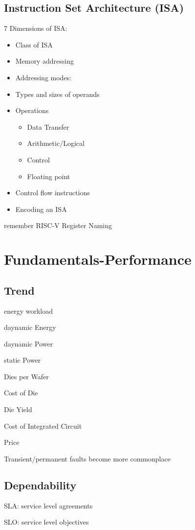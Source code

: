 \subsection{Instruction Set Architecture (ISA)}
7 Dimensions of ISA:
\begin{itemize}
    \item Class of ISA
    \item Memory addressing
    \item Addressing modes: %
    \item Types and sizes of operands
    \item Operations
    \begin{itemize}
        \item Data Transfer
        \item Arithmetic/Logical
        \item Control
        \item Floating point
    \end{itemize}
    \item Control flow instructions
    \item Encoding an ISA
\end{itemize}
remember RISC-V Register Naming %

\section{Fundamentals-Performance}
\subsection{Trend}
energy workload %

daynamic Energy %

daynamic Power %

static Power %

Dies per Wafer %

Cost of Die %

Die Yield %

Cost of Integrated Circuit %

Price %

Transient/permanent faults become more commonplace
\subsection{Dependability}
SLA: service level agreements

SLO: service level objectives

